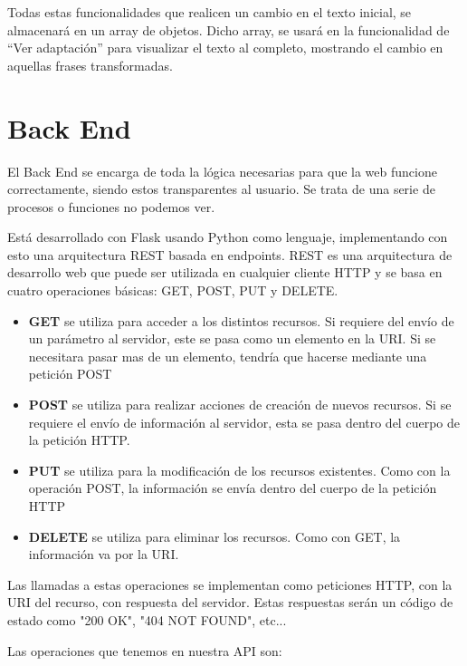 				Todas estas funcionalidades que realicen un cambio en el texto inicial, se almacenará en un array de objetos. Dicho array, se usará en la funcionalidad de ``Ver adaptación'' para visualizar el texto al completo, mostrando el cambio en aquellas frases transformadas.
	





\section{Back End}\label{sec:backend}

El Back End se encarga de toda la lógica necesarias para que la web funcione correctamente, siendo estos transparentes al usuario. Se trata de una serie de procesos o funciones no podemos ver.

Está desarrollado con Flask usando Python como lenguaje, implementando con esto una arquitectura REST basada en endpoints.
REST es una arquitectura de desarrollo web que puede ser utilizada en cualquier cliente HTTP y se basa en cuatro operaciones básicas: GET, POST, PUT y DELETE.
\begin{itemize}
	\item \textbf{GET} se utiliza para acceder a los distintos recursos. Si requiere del envío de un parámetro al servidor, este se pasa como un elemento en la URI. Si se necesitara pasar mas de un elemento, tendría que hacerse mediante una petición POST
	
	\item \textbf{POST} se utiliza para realizar acciones de creación de nuevos recursos. Si se requiere el envío de información al servidor, esta se pasa dentro del cuerpo de la petición HTTP.
	
	\item \textbf{PUT} se utiliza para la modificación de los recursos existentes. Como con la operación POST, la información se envía dentro del cuerpo de la petición HTTP
	
	\item \textbf{DELETE} se utiliza para eliminar los recursos. Como con GET, la información va por la URI.
\end{itemize}
Las llamadas a estas operaciones se implementan como peticiones HTTP, con la URI del recurso, con respuesta del servidor. Estas respuestas serán un código de estado como "200 OK", "404 NOT FOUND", etc...

Las operaciones que tenemos en nuestra API son:

